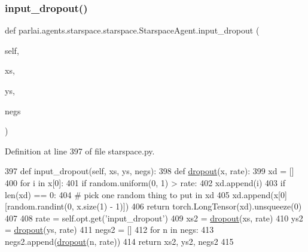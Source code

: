 \subsubsection{\texorpdfstring{input\+\_\+dropout()}{input\_dropout()}}
{\footnotesize\ttfamily def parlai.\+agents.\+starspace.\+starspace.\+Starspace\+Agent.\+input\+\_\+dropout (\begin{DoxyParamCaption}\item[{}]{self,  }\item[{}]{xs,  }\item[{}]{ys,  }\item[{}]{negs }\end{DoxyParamCaption})}



Definition at line 397 of file starspace.\+py.


\begin{DoxyCode}
397     \textcolor{keyword}{def }input\_dropout(self, xs, ys, negs):
398         \textcolor{keyword}{def }\hyperlink{namespaceseq2seq_1_1train_ad1c2b0c39f2fadec077284e46fd39c1f}{dropout}(x, rate):
399             xd = []
400             \textcolor{keywordflow}{for} i \textcolor{keywordflow}{in} x[0]:
401                 \textcolor{keywordflow}{if} random.uniform(0, 1) > rate:
402                     xd.append(i)
403             \textcolor{keywordflow}{if} len(xd) == 0:
404                 \textcolor{comment}{# pick one random thing to put in xd}
405                 xd.append(x[0][random.randint(0, x.size(1) - 1)])
406             \textcolor{keywordflow}{return} torch.LongTensor(xd).unsqueeze(0)
407 
408         rate = self.opt.get(\textcolor{stringliteral}{'input\_dropout'})
409         xs2 = \hyperlink{namespaceseq2seq_1_1train_ad1c2b0c39f2fadec077284e46fd39c1f}{dropout}(xs, rate)
410         ys2 = \hyperlink{namespaceseq2seq_1_1train_ad1c2b0c39f2fadec077284e46fd39c1f}{dropout}(ys, rate)
411         negs2 = []
412         \textcolor{keywordflow}{for} n \textcolor{keywordflow}{in} negs:
413             negs2.append(\hyperlink{namespaceseq2seq_1_1train_ad1c2b0c39f2fadec077284e46fd39c1f}{dropout}(n, rate))
414         \textcolor{keywordflow}{return} xs2, ys2, negs2
415 
\end{DoxyCode}
\mbox{\label{classparlai_1_1agents_1_1starspace_1_1starspace_1_1StarspaceAgent_a57f2fcd5e04246f3d8edf57ccdb99eab}} 
